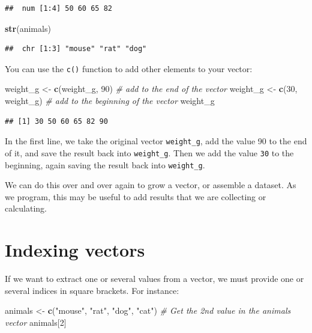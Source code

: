 \documentclass[
]{book}
\newenvironment{Shaded}{\begin{snugshade}}{\end{snugshade}}
\newcommand{\CommentTok}[1]{\textcolor[rgb]{0.56,0.35,0.01}{\textit{#1}}}
\newcommand{\DecValTok}[1]{\textcolor[rgb]{0.00,0.00,0.81}{#1}}
\newcommand{\FunctionTok}[1]{\textcolor[rgb]{0.13,0.29,0.53}{\textbf{#1}}}
\newcommand{\NormalTok}[1]{#1}
\newcommand{\OtherTok}[1]{\textcolor[rgb]{0.56,0.35,0.01}{#1}}
\newcommand{\StringTok}[1]{\textcolor[rgb]{0.31,0.60,0.02}{#1}}
\begin{document}
\begin{verbatim}
##  num [1:4] 50 60 65 82
\end{verbatim}

\begin{Shaded}
\begin{Highlighting}[]
\FunctionTok{str}\NormalTok{(animals)}
\end{Highlighting}
\end{Shaded}

\begin{verbatim}
##  chr [1:3] "mouse" "rat" "dog"
\end{verbatim}

You can use the \texttt{c()} function to add other elements to your vector:

\begin{Shaded}
\begin{Highlighting}[]
\NormalTok{weight\_g }\OtherTok{\textless{}{-}} \FunctionTok{c}\NormalTok{(weight\_g, }\DecValTok{90}\NormalTok{) }\CommentTok{\# add to the end of the vector}
\NormalTok{weight\_g }\OtherTok{\textless{}{-}} \FunctionTok{c}\NormalTok{(}\DecValTok{30}\NormalTok{, weight\_g) }\CommentTok{\# add to the beginning of the vector}
\NormalTok{weight\_g}
\end{Highlighting}
\end{Shaded}

\begin{verbatim}
## [1] 30 50 60 65 82 90
\end{verbatim}

In the first line, we take the original vector \texttt{weight\_g}, add the value 90 to the end of it, and save the result back into \texttt{weight\_g}. Then we add the value \texttt{30} to the beginning, again saving the result back into \texttt{weight\_g}.

We can do this over and over again to grow a vector, or assemble a dataset. As we program, this may be useful to add results that we are collecting or calculating.

\section{Indexing vectors}\label{indexing-vectors}

If we want to extract one or several values from a vector, we must provide one or several indices in square brackets. For instance:

\begin{Shaded}
\begin{Highlighting}[]
\NormalTok{animals }\OtherTok{\textless{}{-}} \FunctionTok{c}\NormalTok{(}\StringTok{"mouse"}\NormalTok{, }\StringTok{"rat"}\NormalTok{, }\StringTok{"dog"}\NormalTok{, }\StringTok{"cat"}\NormalTok{)}
\CommentTok{\# Get the 2nd value in the animals vector}
\NormalTok{animals[}\DecValTok{2}\NormalTok{]}
\end{Highlighting}
\end{Shaded}
\end{document}
